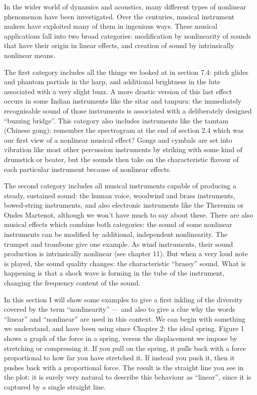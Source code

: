

  In the wider world of dynamics and acoustics, many different types of 
  nonlinear phenomenon have been investigated. Over the centuries, musical 
  instrument makers have exploited many of them in ingenious ways. These 
  musical applications fall into two broad categories: modification by 
  nonlinearity of sounds that have their origin in linear effects, and creation 
  of sound by intrinsically nonlinear means. 

  The first category includes all the things we looked at in section 7.4: pitch 
  glides and phantom partials in the harp, and additional brightness in the 
  lute associated with a very slight buzz. A more drastic version of this last 
  effect occurs in some Indian instruments like the sitar and tanpura: the 
  immediately recognisable sound of those instruments is associated with a 
  deliberately designed ``buzzing bridge''. This category also includes 
  instruments like the tamtam (Chinese gong): remember the spectrogram at the 
  end of section 2.4 which was our first view of a nonlinear musical effect? 
  Gongs and cymbals are set into vibration like most other percussion 
  instruments by striking with some kind of drumstick or beater, but the sounds 
  then take on the characteristic flavour of each particular instrument because 
  of nonlinear effects. 

  The second category includes all musical instruments capable of producing a 
  steady, sustained sound: the human voice, woodwind and brass instruments, 
  bowed-string instruments, and also electronic instruments like the Theremin 
  or Ondes Martenot, although we won't have much to say about these. There are 
  also musical effects which combine both categories: the sound of some 
  nonlinear instruments can be modified by additional, independent 
  nonlinearity. The trumpet and trombone give one example. As wind instruments, 
  their sound production is intrinsically nonlinear (see chapter 11). But when 
  a very loud note is played, the sound quality changes: the characteristic 
  ``brassy'' sound. What is happening is that a shock wave is forming in the 
  tube of the instrument, changing the frequency content of the sound. 

  In this section I will show some examples to give a first inkling of the 
  diversity covered by the term “nonlinearity” — and also to give a clue why 
  the words “linear” and “nonlinear” are used in this context. We can begin 
  with something we understand, and have been using since Chapter 2: the ideal 
  spring. Figure 1 shows a graph of the force in a spring, versus the 
  displacement we impose by stretching or compressing it. If you pull on the 
  spring, it pulls back with a force proportional to how far you have stretched 
  it. If instead you push it, then it pushes back with a proportional force. 
  The result is the straight line you see in the plot: it is surely very 
  natural to describe this behaviour as “linear”, since it is captured by a 
  single straight line. 

